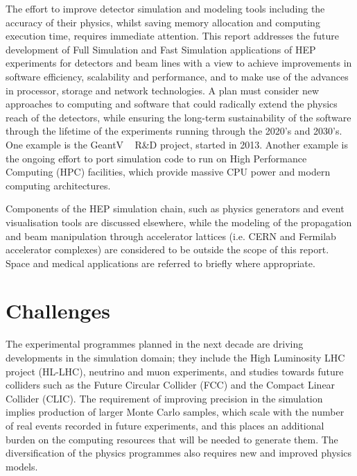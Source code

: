\documentclass[12pt,a4paper]{article}
\begin{document}
The effort to improve detector simulation and modeling tools including
the accuracy of their physics, whilst saving memory allocation and
computing execution time, requires immediate attention. This report
addresses the future development of Full Simulation and Fast Simulation
applications of HEP experiments for detectors and beam lines with a view
to achieve improvements in software efficiency, scalability and
performance, and to make use of the advances in processor, storage and
network technologies. A plan must consider new approaches to computing
and software that could radically extend the physics reach of the
detectors, while ensuring the long-term sustainability of the software
through the lifetime of the experiments running through the 2020's and
2030's. One example is the GeantV ~\cite{1742-6596-396-2-022014} R\&D project, started in 2013.
Another example is the ongoing effort to port simulation code to run on
High Performance Computing (HPC) facilities, which provide massive CPU
power and modern computing architectures.

Components of the HEP simulation chain, such as physics generators and
event visualisation tools are discussed elsewhere, while the
modeling of the propagation and beam manipulation through accelerator
lattices (i.e. CERN and Fermilab accelerator complexes) are considered
to be outside the scope of this report. Space and medical applications
are referred to briefly where appropriate.


\hypertarget{challenges}{%
\section{Challenges}\label{challenges}}

The experimental programmes planned in the next decade are driving
developments in the simulation domain; they include the High Luminosity
LHC project (HL-LHC), neutrino and muon experiments, and studies towards
future colliders such as the Future Circular Collider (FCC) and the
Compact Linear Collider (CLIC). The requirement of improving precision
in the simulation implies production of larger Monte Carlo samples,
which scale with the number of real events recorded in future
experiments, and this places an additional burden on the computing
resources that will be needed to generate them. The diversification of
the physics programmes also requires new and improved physics models.
\end{document}
